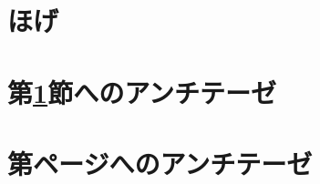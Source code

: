 \documentclass{jarticle}
\begin{document}

\tableofcontents
\section{ほげ}\label{sec:hoge}
\section{第\ref{sec:hoge}節へのアンチテーゼ}
\section{第\pageref{sec:hoge}ページへのアンチテーゼ}
\end{document}
